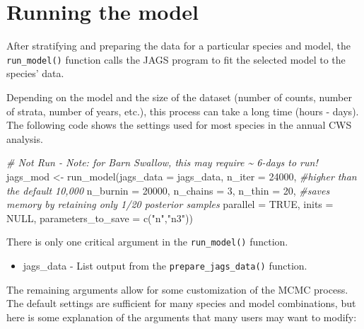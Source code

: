 \documentclass[
]{book}
\newenvironment{Shaded}{\begin{snugshade}}{\end{snugshade}}
\newcommand{\AttributeTok}[1]{\textcolor[rgb]{0.77,0.63,0.00}{#1}}
\newcommand{\CommentTok}[1]{\textcolor[rgb]{0.56,0.35,0.01}{\textit{#1}}}
\newcommand{\ConstantTok}[1]{\textcolor[rgb]{0.00,0.00,0.00}{#1}}
\newcommand{\DecValTok}[1]{\textcolor[rgb]{0.00,0.00,0.81}{#1}}
\newcommand{\FunctionTok}[1]{\textcolor[rgb]{0.00,0.00,0.00}{#1}}
\newcommand{\NormalTok}[1]{#1}
\newcommand{\OtherTok}[1]{\textcolor[rgb]{0.56,0.35,0.01}{#1}}
\newcommand{\StringTok}[1]{\textcolor[rgb]{0.31,0.60,0.02}{#1}}
\providecommand{\tightlist}{%
  \setlength{\itemsep}{0pt}\setlength{\parskip}{0pt}}
\begin{document}
\hypertarget{ModelRun}{%
\chapter{Running the model}\label{ModelRun}}

After stratifying and preparing the data for a particular species and model, the \texttt{run\_model()} function calls the JAGS program to fit the selected model to the species' data.

Depending on the model and the size of the dataset (number of counts, number of strata, number of years, etc.), this process can take a long time (hours - days). The following code shows the settings used for most species in the annual CWS analysis.

\begin{Shaded}
\begin{Highlighting}[]
\CommentTok{\# Not Run {-} Note: for Barn Swallow, this may require \textasciitilde{} 6{-}days to run!}
\NormalTok{jags\_mod }\OtherTok{\textless{}{-}} \FunctionTok{run\_model}\NormalTok{(}\AttributeTok{jags\_data =}\NormalTok{ jags\_data,}
                      \AttributeTok{n\_iter =} \DecValTok{24000}\NormalTok{, }\CommentTok{\#higher than the default 10,000}
                      \AttributeTok{n\_burnin =} \DecValTok{20000}\NormalTok{,}
                      \AttributeTok{n\_chains =} \DecValTok{3}\NormalTok{,}
                      \AttributeTok{n\_thin =} \DecValTok{20}\NormalTok{, }\CommentTok{\#saves memory by retaining only 1/20 posterior samples}
                      \AttributeTok{parallel =} \ConstantTok{TRUE}\NormalTok{,}
                      \AttributeTok{inits =} \ConstantTok{NULL}\NormalTok{,}
                      \AttributeTok{parameters\_to\_save =} \FunctionTok{c}\NormalTok{(}\StringTok{"n"}\NormalTok{,}\StringTok{"n3"}\NormalTok{))}
 
\end{Highlighting}
\end{Shaded}

There is only one critical argument in the \texttt{run\_model()} function.

\begin{itemize}
\tightlist
\item
  jags\_data - List output from the \texttt{prepare\_jags\_data()} function.
\end{itemize}

The remaining arguments allow for some customization of the MCMC process. The default settings are sufficient for many species and model combinations, but here is some explanation of the arguments that many users may want to modify:
\end{document}
